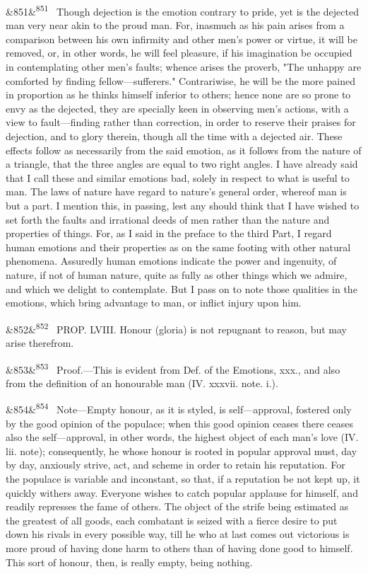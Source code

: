 \documentclass[12pt]{article}
\newcommand{\para}[1][]{\par\noindent\ifx&#1&\else\textsuperscript{\footnotesize #1}~\fi}
\begin{document}
\para[851] Though dejection is the emotion contrary to pride, yet is the dejected man very near akin to the proud man. For, inasmuch as his pain arises from a comparison between his own infirmity and other men's power or virtue, it will be removed, or, in other words, he will feel pleasure, if his imagination be occupied in contemplating other men's faults; whence arises the proverb, "The unhappy are comforted by finding fellow---sufferers." Contrariwise, he will be the more pained in proportion as he thinks himself inferior to others; hence none are so prone to envy as the dejected, they are specially keen in observing men's actions, with a view to fault---finding rather than correction, in order to reserve their praises for dejection, and to glory therein, though all the time with a dejected air. These effects follow as necessarily from the said emotion, as it follows from the nature of a triangle, that the three angles are equal to two right angles. I have already said that I call these and similar emotions bad, solely in respect to what is useful to man. The laws of nature have regard to nature's general order, whereof man is but a part. I mention this, in passing, lest any should think that I have wished to set forth the faults and irrational deeds of men rather than the nature and properties of things. For, as I said in the preface to the third Part, I regard human emotions and their properties as on the same footing with other natural phenomena. Assuredly human emotions indicate the power and ingenuity, of nature, if not of human nature, quite as fully as other things which we admire, and which we delight to contemplate. But I pass on to note those qualities in the emotions, which bring advantage to man, or inflict injury upon him.

\para[852] PROP. LVIII. Honour (gloria) is not repugnant to reason, but may arise therefrom.

\para[853] Proof.---This is evident from Def. of the Emotions, xxx., and also from the definition of an honourable man (IV. xxxvii. note. i.).

\para[854] Note---Empty honour, as it is styled, is self---approval, fostered only by the good opinion of the populace; when this good opinion ceases there ceases also the self---approval, in other words, the highest object of each man's love (IV. lii. note); consequently, he whose honour is rooted in popular approval must, day by day, anxiously strive, act, and scheme in order to retain his reputation. For the populace is variable and inconstant, so that, if a reputation be not kept up, it quickly withers away. Everyone wishes to catch popular applause for himself, and readily represses the fame of others. The object of the strife being estimated as the greatest of all goods, each combatant is seized with a fierce desire to put down his rivals in every possible way, till he who at last comes out victorious is more proud of having done harm to others than of having done good to himself. This sort of honour, then, is really empty, being nothing.
\end{document}
